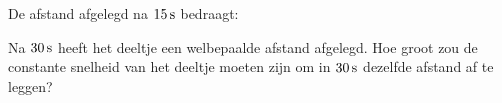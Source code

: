\begin{exercise} 


\end{exercise}

\begin{exercise} 
\end{exercise}

\begin{exercise} De afstand afgelegd na $15\rm\,s$ bedraagt:
\end{exercise}

\begin{exercise} Na $30\rm\,s$ heeft het deeltje een welbepaalde afstand afgelegd. Hoe groot zou de constante snelheid van het deeltje moeten zijn om in $30\rm\,s$ dezelfde afstand af te leggen?
\end{exercise}

